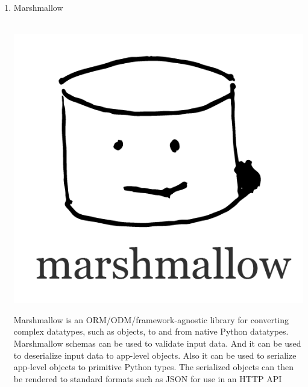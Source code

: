 \documentclass[conference]{IEEEtran}
\begin{document}
\begin{enumerate}
    
    \item Marshmallow \\ \\
    \centerline{\includegraphics [scale=0.3] {assets/marshmallow.png}}
    Marshmallow is an ORM/ODM/framework-agnostic library for converting complex datatypes, such as objects, to and from native Python datatypes. Marshmallow schemas can be used to validate input data. And it can be used to deserialize input data to app-level objects. Also it can be used to serialize app-level objects to primitive Python types. The serialized objects can then be rendered to standard formats such as JSON for use in an HTTP API  

 \break
    

\end{enumerate}
\end{document}
